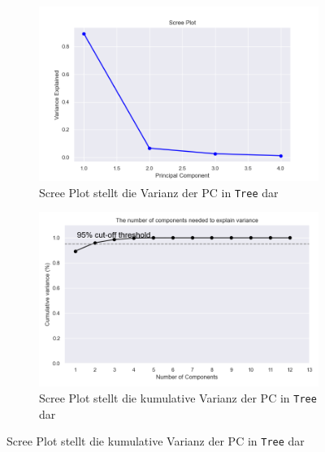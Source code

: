 \begin{figure}
    \begin{subfigure}{.5\textwidth}
        \includegraphics[width=\textwidth]{images/30_results/tree-scree.png}
        \caption{Scree Plot stellt die Varianz der PC in \texttt{Tree} dar}
        \label{fig:scree-tree}
    \end{subfigure}%
    \begin{subfigure}{.5\textwidth}
        \includegraphics[width=\textwidth]{images/30_results/tree-scree-cum.png}
        \caption{Scree Plot stellt die kumulative Varianz der PC in \texttt{Tree} dar}
        \label{fig:scree-cum-tree}
    \end{subfigure}


\end{figure}
